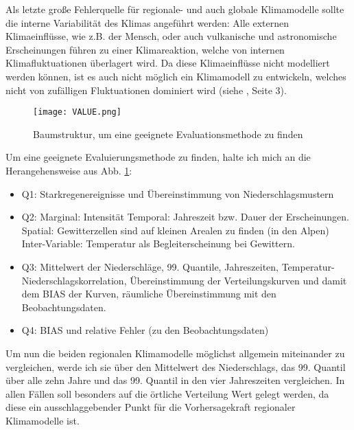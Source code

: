 Als letzte große Fehlerquelle für regionale- und auch globale Klimamodelle sollte die interne Variabilität des Klimas angeführt werden: Alle externen Klimaeinflüsse, wie z.B. der Mensch, oder auch vulkanische und astronomische Erscheinungen führen zu einer Klimareaktion, welche von internen Klimafluktuationen überlagert wird. Da diese Klimaeinflüsse nicht modelliert werden können, ist es auch nicht möglich ein Klimamodell zu entwickeln, welches nicht von zufälligen Fluktuationen dominiert wird (siehe \cite{maraun_value}, Seite 3).\\
\begin{figure}[h]
	\centering
	\texttt{[image: VALUE.png]}
	\caption{Baumstruktur, um eine geeignete Evaluationsmethode zu finden \cite{maraun_value}}
	\label{fig:value}
\end{figure}

Um eine geeignete Evaluierungsmethode zu finden, halte ich mich an die Herangehensweise aus Abb. \ref{fig:value}:
\begin{itemize}
	\item Q1: Starkregenereignisse und Übereinstimmung von Niederschlagsmustern
	\item Q2:
		\subitem{*} Marginal: Intensität
		\subitem{*} Temporal: Jahreszeit bzw. Dauer der Erscheinungen.
		\subitem{*} Spatial: Gewitterzellen sind auf kleinen Arealen zu finden (in den Alpen)
		\subitem{*} Inter-Variable: Temperatur als Begleiterscheinung bei Gewittern.
	\item Q3: Mittelwert der Niederschläge, 99. Quantile, Jahreszeiten, Temperatur-Niederschlagskorrelation, Übereinstimmung der Verteilungskurven und damit dem BIAS der Kurven, räumliche Übereinstimmung mit den Beobachtungsdaten.
	\item Q4: BIAS und relative Fehler (zu den Beobachtungsdaten)
\end{itemize}

Um nun die beiden regionalen Klimamodelle möglichst allgemein miteinander zu vergleichen, werde ich sie über den Mittelwert des Niederschlags, das 99. Quantil über alle zehn Jahre und das 99. Quantil in den vier Jahreszeiten vergleichen. In allen Fällen soll besonders auf die örtliche Verteilung Wert gelegt werden, da diese ein ausschlaggebender Punkt für die Vorhersagekraft regionaler Klimamodelle ist.



